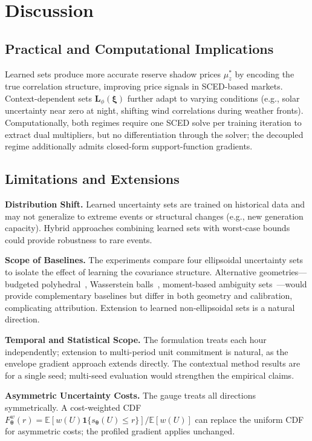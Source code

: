 \documentclass[11pt]{article}
\newcommand{\E}{\mathbb{E}}
\newcommand{\btheta}{\bm{\theta}}
\newcommand{\bxi}{\bm{\xi}}
\newcommand{\bL}{\bm{L}}
\theoremstyle{definition}
\begin{document}
\section{Discussion}
\label{sec:discussion}

\subsection{Practical and Computational Implications}

Learned sets produce more accurate reserve shadow prices $\mu_z^*$ by encoding the true correlation structure, improving price signals in SCED-based markets. Context-dependent sets $\bL_\phi(\bxi)$ further adapt to varying conditions (e.g., solar uncertainty near zero at night, shifting wind correlations during weather fronts). Computationally, both regimes require one SCED solve per training iteration to extract dual multipliers, but no differentiation through the solver; the decoupled regime additionally admits closed-form support-function gradients.

\subsection{Limitations and Extensions}

\textbf{Distribution Shift.} Learned uncertainty sets are trained on historical data and may not generalize to extreme events or structural changes (e.g., new generation capacity). Hybrid approaches combining learned sets with worst-case bounds could provide robustness to rare events.

\textbf{Scope of Baselines.} The experiments compare four ellipsoidal uncertainty sets to isolate the effect of learning the covariance structure. Alternative geometries---budgeted polyhedral~\citep{bertsimas2004price}, Wasserstein balls~\citep{esfahani2018data}, moment-based ambiguity sets~\citep{xiong2017distributionally}---would provide complementary baselines but differ in both geometry and calibration, complicating attribution. Extension to learned non-ellipsoidal sets is a natural direction.

\textbf{Temporal and Statistical Scope.} The formulation treats each hour independently; extension to multi-period unit commitment is natural, as the envelope gradient approach extends directly. The contextual method results are for a single seed; multi-seed evaluation would strengthen the empirical claims.

\textbf{Asymmetric Uncertainty Costs.} The gauge treats all directions symmetrically. A cost-weighted CDF $F_{\btheta}^w(r) = \E[w(U)\mathbf{1}\{s_{\btheta}(U)\le r\}]/\E[w(U)]$ can replace the uniform CDF for asymmetric costs; the profiled gradient applies unchanged.
\end{document}
